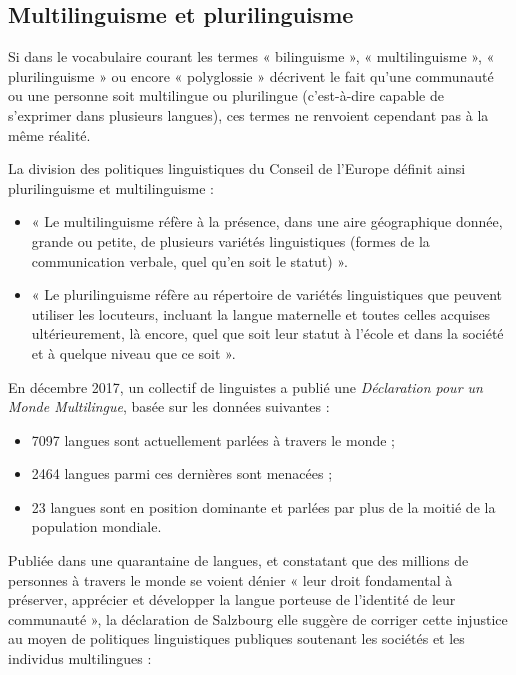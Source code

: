 \subsection{Multilinguisme et plurilinguisme}
Si dans le vocabulaire courant les termes « bilinguisme », « multilinguisme », « plurilinguisme » ou encore « polyglossie » décrivent le fait qu’une communauté ou une personne soit multilingue ou plurilingue (c’est-à-dire capable de s’exprimer dans plusieurs langues), ces termes ne renvoient cependant pas à la même réalité.

La division des politiques linguistiques du Conseil de l’Europe définit ainsi plurilinguisme et multilinguisme :
\begin{itemize}
\item « Le multilinguisme réfère à la présence, dans une aire géographique donnée, grande ou petite, de plusieurs variétés linguistiques (formes de la communication verbale, quel qu’en soit le statut) ».
\item « Le plurilinguisme réfère au répertoire de variétés linguistiques que peuvent utiliser les locuteurs, incluant la langue maternelle et toutes celles acquises ultérieurement, là encore, quel que soit leur statut à l’école et dans la société et à quelque niveau que ce soit ».
\end{itemize}

En décembre 2017, un collectif de linguistes a publié une \textit{Déclaration pour un Monde Multilingue}, basée sur les données suivantes :
\begin{itemize}
\item 7097 langues sont actuellement parlées à travers le monde ;
\item 2464 langues parmi ces dernières sont menacées ;
\item 23 langues sont en position dominante et parlées par plus de la moitié de la population mondiale.
\end{itemize}

Publiée dans une quarantaine de langues, et constatant que des millions de personnes à travers le monde se voient dénier « leur droit fondamental à préserver, apprécier et développer la langue porteuse de l’identité de leur communauté », la déclaration de Salzbourg elle suggère de corriger cette injustice au moyen de politiques linguistiques publiques soutenant les sociétés et les individus multilingues :

